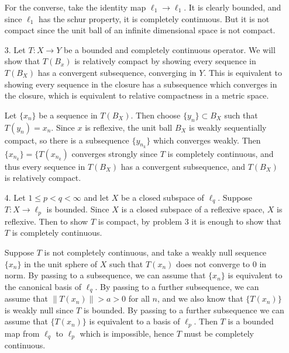 \documentclass[11pt, reqno]{article}
\theoremstyle{plain}
\theoremstyle{definition}
\theoremstyle{remark}
\begin{document}
\begin{enumerate}
    For the converse, take the identity map $\ell_1 \rightarrow \ell_1$. It is clearly bounded, and since $\ell_1$ has the schur 
    property, it is completely continuous. But it is not compact since the unit ball of an infinite dimensional space
    is not compact.

    \item[3.] Let $T: X \rightarrow Y$ be a bounded and completely continuous operator. We will show that $T(B_x)$ is relatively compact
    by showing every sequence in $T(B_X)$ has a convergent subsequence, converging in $Y$. This is equivalent to showing 
    every sequence in the closure has a subsequence which converges in the closure, which is equivalent to relative compactness
    in a metric space. 

    Let $\{x_n\}$ be a sequence in $T(B_X)$. Then choose $\{y_n\} \subset B_X$ such that $T(y_n) = x_n$. Since $x$ is reflexive, 
    the unit ball $B_X$ is weakly sequentially compact, so there is a subsequence $\{y_{n_k}\}$ which converges weakly.
    Then $\{x_{n_k}\} = \{T(x_{n_k})$ converges strongly since $T$ is completely continuous, and thus every sequence
    in $T(B_X)$ has a convergent subsequence, and $T(B_X)$ is relatively compact. 

    \item[4.] Let $1 \leq p < q < \infty$ and let $X$ be a closed subspace of $\ell_q$. Suppose $T: X \rightarrow \ell_p$ is 
    bounded. Since $X$ is a closed subspace of a reflexive space, $X$ is reflexive. 
    Then to show $T$ is compact, by problem 3 it is enough to show that $T$ is completely continuous. 

    Suppose $T$ is not completely continuous, and take a weakly null sequence $\{x_n\}$ in the unit sphere of $X$
    such that $T(x_n)$ does not converge to $0$ in norm. By passing to a subsequence, we can assume that $\{x_n\}$ is 
    equivalent to the canonical basis of $\ell_q$. By passing to a further subsequence, we can assume that $\|T(x_n)\| > a > 0$ 
    for all $n$, and we also know that $\{T(x_n)\}$ is weakly null since $T$ is bounded. By passing to a further subsequence 
    we can assume that $\{T(x_n)\}$ is equivalent to a basis of $\ell_p$. Then $T$ is a bounded map from $\ell_q$ to $\ell_p$
    which is impossible, hence $T$ must be completely continuous.

\end{enumerate}
\end{document}
